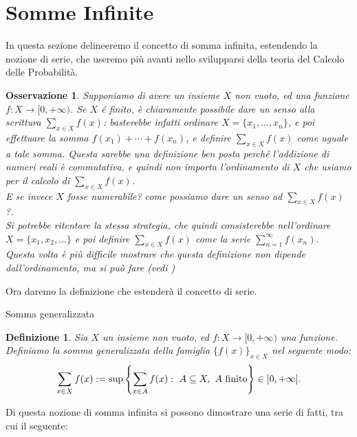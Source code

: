 \documentclass[11pt]{book}
\theoremstyle{Definizione}
\newtheorem*{mydef}{Definizione}
\theoremstyle{TeoremaProposizioneLemmaCorollario}
\theoremstyle{OsservazioneNota}
\newtheorem{myobs}{Osservazione}[section]
\begin{document}
\section{Somme Infinite}
In questa sezione delineeremo il concetto di somma infinita, estendendo la nozione di serie, che useremo più avanti nello svilupparsi della teoria del Calcolo delle Probabilità.
\begin{myobs}
Supponiamo di avere un insieme $X$ non vuoto, ed una funzione $f:X\longrightarrow [0,+\infty)$. Se $X$ é finito, è chiaramente possibile dare un senso alla scrittura $\sum_{x\in X} f(x)$: basterebbe infatti ordinare $X = \{x_1,\dots,x_n\}$, e poi effettuare la somma $f(x_1)+\cdots+f(x_n)$, e definire $\sum_{x\in X} f(x)$ come uguale a tale somma. Questa sarebbe una definizione ben posta perché l'addizione di numeri reali è commutativa, e quindi non importa l'ordinamento di $X$ che usiamo per il calcolo di $\sum_{x\in X} f(x)$.\\
E se invece $X$ fosse numerabile? come possiamo dare un senso ad $\sum_{x\in X} f(x)$?.\\
Si potrebbe ritentare la stessa strategia, che quindi consisterebbe nell'ordinare $X = \{x_1,x_2,\dots\}$ e poi definire $\sum_{x\in X} f(x)$ come la serie $\sum_{n = 1}^\infty f(x_n)$.\\
Questa volta è più difficile mostrare che questa definizione non dipende dall'ordinamento, ma si può fare (vedi \cite{acerbibuttazzo})
\end{myobs}
Ora daremo la definizione che estenderà il concetto di serie.
\begin{boxdef}{Somma generalizzata}
\begin{mydef}
Sia $X$ un insieme non vuoto, ed $f:X \longrightarrow [0,+\infty)$ una funzione. Definiamo la somma generalizzata della famiglia $\{f(x)\}_{x\in X}$ nel seguente modo:
$$
\sum_{x\in X} f(x) := \sup\left\{\sum_{x\in A} f(x):\ A\subseteq X,\ A\textup{ finito}\right\}\in [0,+\infty].
$$
\end{mydef}
\end{boxdef}
\noindent
Di questa nozione di somma infinita si possono dimostrare una serie di fatti, tra cui il seguente:
\end{document}
